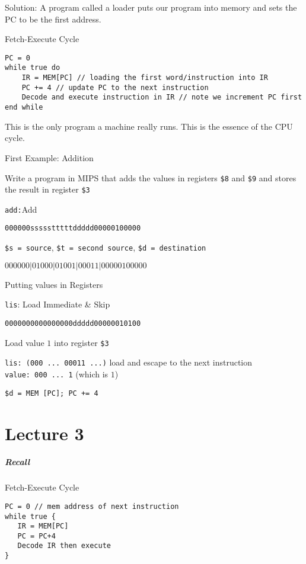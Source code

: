\documentclass{article}
\begin{document}
Solution: A program called a loader puts our program into memory and
sets the PC to be the first address.

Fetch-Execute Cycle

\begin{tcolorbox}
\begin{verbatim}
PC = 0
while true do
    IR = MEM[PC] // loading the first word/instruction into IR
    PC += 4 // update PC to the next instruction 
    Decode and execute instruction in IR // note we increment PC first
end while
\end{verbatim}
\end{tcolorbox}

This is the only program a machine really runs. This is the essence of
the CPU cycle.

First Example: Addition

Write a program in MIPS that adds the values in registers \texttt{\$8}
and \texttt{\$9} and stores the result in register \texttt{\$3}

\texttt{add:}Add

\texttt{000000ssssstttttddddd00000100000}

\texttt{\$s\ =\ source}, \texttt{\$t\ =\ second\ source},
\texttt{\$d\ =\ destination}

\(000000|01000|01001|00011|00000100000\)

Putting values in Registers

\texttt{lis}: Load Immediate \& Skip

\texttt{0000000000000000ddddd00000010100}

Load value \(1\) into register \texttt{\$3}

\texttt{lis:\ (000\ ...\ 00011\ ...)} load and escape to the next
instruction \texttt{value:\ 000\ ...\ 1} (which is \(1\))

\texttt{\$d\ =\ MEM\ {[}PC{]};\ PC\ +=\ 4}

\section{Lecture 3}\label{lecture-3}

\subparagraph{Recall}\label{recall}

Fetch-Execute Cycle

\begin{tcolorbox}
\begin{verbatim}
PC = 0 // mem address of next instruction
while true {
   IR = MEM[PC]
   PC = PC+4
   Decode IR then execute
}
\end{verbatim}
\end{tcolorbox}
\end{document}

